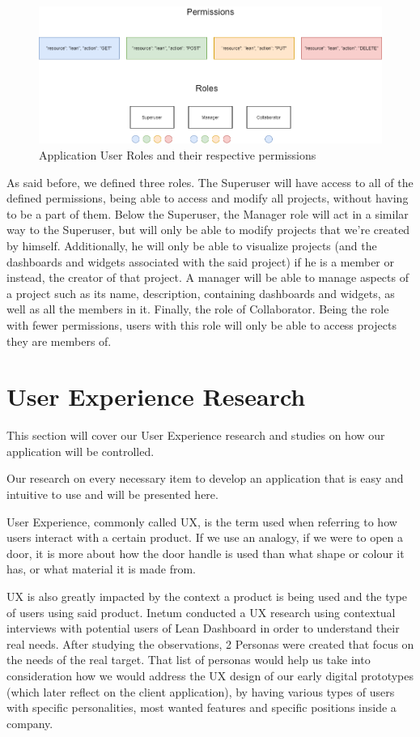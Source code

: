 \documentclass[a4paper,twoside,10pt]{report}
\begin{document}
\begin{figure}[h!]
\center
    \includegraphics[width=\textwidth]{lean-rbac-model.png}
\caption{Application User Roles and their respective permissions}
\end{figure}
As said before, we defined three roles. The Superuser will have access to all of the defined permissions, being able to access and modify all projects,  without having to be a part of them. 
Below the Superuser, the Manager role will act in a similar way to the Superuser, but will only be able to modify projects that we're created by himself. Additionally, he will only be able to visualize projects (and the dashboards and widgets associated with the said project) if he is a member or instead, the creator of that project. A manager will be able to manage aspects of a project such as its name, description, containing dashboards and widgets, as well as all the members in it.
Finally, the role of Collaborator. Being the role with fewer permissions, users with this role will only be able to access projects they are members of.

\chapter{User Experience Research}
This section will cover our User Experience research and studies on how our application will be controlled.

Our research on every necessary item to develop an application that is easy and intuitive to use and will be presented here.

User Experience, commonly called UX, is the term used when referring to how users interact with a certain product. If we use an analogy, if we were to open a door, it is more about how the door handle is used than what shape or colour it has, or what material it is made from. 

UX is also greatly impacted by the context a product is being used and the type of users using said product. Inetum conducted a UX research using contextual interviews with potential users of Lean Dashboard in order to understand their real needs. After studying the observations, 2 Personas were created that focus on the needs of the real target. That list of personas would help us take into consideration how we would address the UX design of our early digital prototypes (which later reflect on the client application), by having various types of users with specific personalities, most wanted features and specific positions inside a company. 
\end{document}
